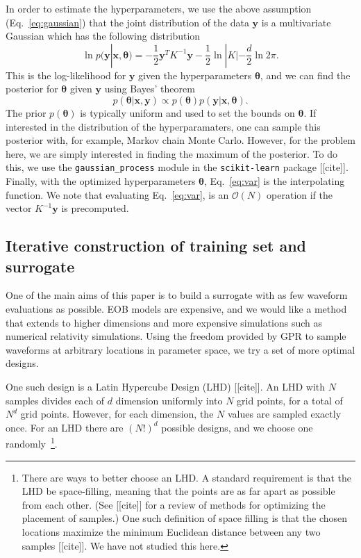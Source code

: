 \documentclass[prd,aps,letter,twocolumn,floatfix,notitlepage,nofootinbib]{revtex4-1}
\begin{document}
In order to estimate the hyperparameters, we use the above assumption (Eq.~\eqref{eq:gaussian}) that the joint distribution of 
the data ${\bm y}$ is a multivariate Gaussian which has the following distribution
\begin{equation}
\ln p({\bm y} | {\bm x}, {\bm \theta}) = -\frac{1}{2}{\bm y}^T K^{-1} {\bm y} - \frac{1}{2} \ln |K| - \frac{d}{2} \ln 2\pi.
\end{equation}
This is the log-likelihood for ${\bm y}$ given the hyperparameters ${\bm \theta}$, and we can find the posterior for ${\bm \theta}$
given ${\bm y}$ using Bayes' theorem
\begin{equation}
p({\bm \theta} | {\bm x}, {\bm y}) \propto p({\bm \theta}) p({\bm y} | {\bm x}, {\bm \theta}).
\end{equation}
The prior $p({\bm \theta})$ is typically uniform and used to set the bounds on ${\bm \theta}$. If interested in the distribution of the 
hyperparamaters, one can sample this posterior with, for example, Markov chain Monte Carlo. However, for the problem here, we are
simply interested in finding the maximum of the posterior. To do this, we use the \texttt{gaussian\_process} module in the
\texttt{scikit-learn} package [[cite]]. Finally, with the optimized hyperparameters ${\bm \theta}$, Eq.~\eqref{eq:var} is the 
interpolating function. We note that evaluating Eq.~\eqref{eq:var}, is an $\mathcal{O}(N)$ operation if the vector $K^{-1}{\bm y}$ is
precomputed.


\subsection{Iterative construction of training set and surrogate}

One of the main aims of this paper is to build a surrogate with as few waveform evaluations as possible. EOB models are expensive, and we would like a method that extends to higher dimensions and more expensive simulations such as numerical relativity simulations. Using the freedom provided by GPR to sample waveforms at arbitrary locations in parameter space, we try a set of more optimal designs. 

One such design is a Latin Hypercube Design (LHD) [[cite]]. An LHD with $N$ samples divides each of $d$ dimension uniformly into $N$ grid points, for a total of $N^d$ grid points. However, for each dimension, the $N$ values are sampled exactly once. For an LHD there are $(N!)^d$ possible designs, and we choose one randomly~\footnote{There are ways to better choose an LHD. A standard requirement is that the LHD be space-filling, meaning that the points are as far apart as possible from each other. (See [[cite]] for a review of methods for optimizing the placement of samples.) One such definition of space filling is that the chosen locations maximize the minimum Euclidean distance between any two samples [[cite]]. We have not studied this here.}.
\end{document}
